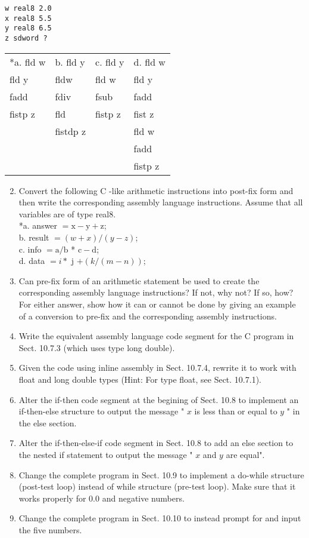 \documentclass[10pt]{article}
\begin{document}
\begin{verbatim}
w real8 2.0
x real8 5.5
y real8 6.5
z sdword ?
\end{verbatim}

\begin{center}
\begin{tabular}{llll}
*a. fld w & b. fld y & c. fld y & d. fld w \\
fld y & fldw & fld w & fld y \\
fadd & fdiv & fsub & fadd \\
fistp z & fld & fistp z & fist z \\
 & fistdp z &  & fld w \\
 &  &  & fadd \\
 &  &  & fistp z \\
\end{tabular}
\end{center}

\begin{enumerate}
  \setcounter{enumi}{1}
  \item Convert the following C -like arithmetic instructions into post-fix form and then write the corresponding assembly language instructions. Assume that all variables are of type real8.\\
*a. answer $=\mathrm{x}-\mathrm{y}+\mathrm{z}$;\\
b. result $=(w+x) /(y-z)$;\\
c. info $=\mathrm{a} / \mathrm{b}$ * $\mathrm{c}-\mathrm{d}$;\\
d. data $=i *$ j $+(k /(m-n))$;
  \item Can pre-fix form of an arithmetic statement be used to create the corresponding assembly language instructions? If not, why not? If so, how? For either answer, show how it can or cannot be done by giving an example of a conversion to pre-fix and the corresponding assembly instructions.
  \item Write the equivalent assembly language code segment for the C program in Sect. 10.7.3 (which uses type long double).
  \item Given the code using inline assembly in Sect. 10.7.4, rewrite it to work with float and long double types (Hint: For type float, see Sect. 10.7.1).
  \item Alter the if-then code segment at the begining of Sect. 10.8 to implement an if-then-else structure to output the message " $x$ is less than or equal to $y$ " in the else section.
  \item Alter the if-then-else-if code segment in Sect. 10.8 to add an else section to the nested if statement to output the message " $x$ and $y$ are equal".
  \item Change the complete program in Sect. 10.9 to implement a do-while structure (post-test loop) instead of while structure (pre-test loop). Make sure that it works properly for 0.0 and negative numbers.
  \item Change the complete program in Sect. 10.10 to instead prompt for and input the five numbers.
\end{enumerate}
\end{document}
